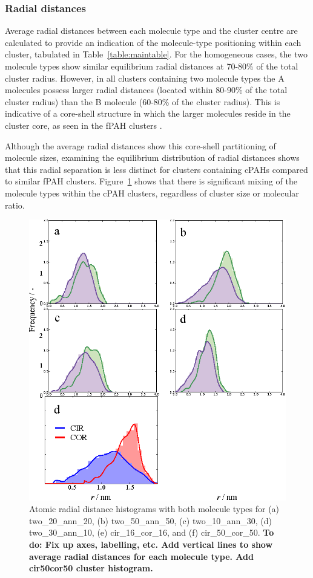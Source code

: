 \subsubsection{Radial distances}
Average radial distances between each molecule type and the cluster centre are calculated to provide an indication of the molecule-type positioning within each cluster, tabulated in  Table~\ref{table:maintable}. For the homogeneous cases, the two molecule types show similar equilibrium radial distances at 70-80\% of the total cluster radius. However, in all clusters containing two molecule types the A molecules possess larger radial distances (located within 80-90\% of the total cluster radius) than the B molecule (60-80\% of the cluster radius). This is indicative of a core-shell structure in which the larger molecules reside in the cluster core, as seen in the fPAH clusters \cite{bowal2018partitioning}.

Although the average radial distances show this core-shell partitioning of molecule sizes, examining the equilibrium distribution of radial distances shows that this radial separation is less distinct for clusters containing cPAHs compared to similar fPAH clusters. Figure~\ref{fig:radialdists_atomic} shows that there is significant mixing of the molecule types within the cPAH clusters, regardless of cluster size or molecular ratio.

%
\begin{figure}[!tbh]
\centering
\includegraphics[width=0.8\linewidth]{Figures/radii_histograms_aa.eps}
\caption{Atomic radial distance histograms with both molecule types for (a) two\_20\_ann\_20, (b) two\_50\_ann\_50, (c) two\_10\_ann\_30, (d) two\_30\_ann\_10, (e) cir\_16\_cor\_16, and (f) cir\_50\_cor\_50. \textbf{To do: Fix up axes, labelling, etc. Add vertical lines to show average radial distances for each molecule type. Add cir50cor50 cluster histogram.}}
\label{fig:radialdists_atomic}
\end{figure}
%

